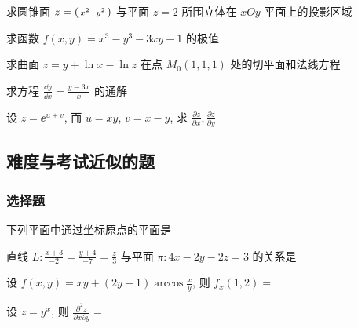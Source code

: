 \begin{ti}
	求圆锥面 $z = \smqty({x^2+y^2})$ 与平面 $z = 2$ 所围立体在 $xOy$ 平面上的投影区域
\end{ti}

\begin{ti}
	求函数 $f(x,y) = x^3 - y^3 - 3xy + 1$ 的极值
\end{ti}

\begin{ti}
	求曲面 $z = y + \ln x - \ln z$ 在点 $M_0(1,1,1)$ 处的切平面和法线方程
\end{ti}

\begin{ti}
	求方程 $\frac{\dd{y}}{\dd{x}} = \frac{y - 3x}{x}$ 的通解
\end{ti}

\begin{ti}
	设 $z = \ee^{u+v}$, 而 $u = xy$, $v = x - y$, 求 $\frac{\partial z}{\partial x}, \frac{\partial z}{\partial y}$
\end{ti}

\subsection{难度与考试近似的题}
\subsubsection{选择题}
\begin{ti}
	下列平面中通过坐标原点的平面是 \kuo
\end{ti}

\begin{ti}
	直线 $L: \frac{x + 3}{-2} = \frac{y + 4}{-7} = \frac{z}{3}$ 与平面 $\pi: 4x - 2y - 2z = 3$ 的关系是 \kuo
\end{ti}

\begin{ti}
	设 $f(x,y) = xy + (2y - 1) \arccos \frac{x}{y}$, 则 $f_{x}(1,2) = $ \kuo
\end{ti}

\begin{ti}
	设 $z = y^{x}$, 则 $\frac{\partial^{2}z}{\partial x \partial y} = $ \kuo
\end{ti}

